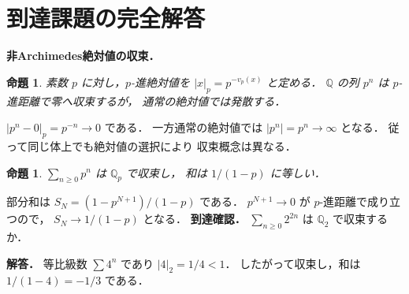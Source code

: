 \documentclass[a5paper,10pt,onecolumn]{jsarticle}
\makeatletter
\theoremstyle{mathnotetheorem}
\newtheorem{proposition}[theorem]{命題}
\renewcommand{\proofname}{証明}
\renewenvironment{proof}[1][\proofname]{%
  \par\pushQED{\qed}\normalfont\topsep4\p@\@plus2\p@\relax
  \trivlist\item[\hskip\labelsep\bfseries #1]\ignorespaces
}{\popQED\endtrivlist\@endpefalse}
\makeatother
\begin{document}
\section{到達課題の完全解答}
\noindent\textbf{非Archimedes絶対値の収束．}
\begin{proposition}
素数 $p$ に対し，$p$-進絶対値を
$|x|_p=p^{-v_p(x)}$ と定める．
$\mathbb Q$ の列 $p^n$ は $p$-進距離で零へ収束するが，
通常の絶対値では発散する．
\end{proposition}
\begin{proof}
$|p^n-0|_p=p^{-n}\to0$ である．
一方通常の絶対値では $|p^n|=p^n\to\infty$ となる．
従って同じ体上でも絶対値の選択により
収束概念は異なる．
\end{proof}
\begin{proposition}
$\sum_{n\ge0}p^n$ は $\mathbb Q_p$ で収束し，
和は $1/(1-p)$ に等しい．
\end{proposition}
\begin{proof}
部分和は
$S_N=(1-p^{N+1})/(1-p)$ である．
$p^{N+1}\to0$ が $p$-進距離で成り立つので，
$S_N\to1/(1-p)$ となる．
\end{proof}
\noindent\textbf{到達確認．}
$\sum_{n\ge0}2^{2n}$ は $\mathbb Q_2$ で収束するか．
\par\noindent\textbf{解答．}
等比級数 $\sum4^n$ であり $|4|_2=1/4<1$．
したがって収束し，和は $1/(1-4)=-1/3$ である．
\end{document}
